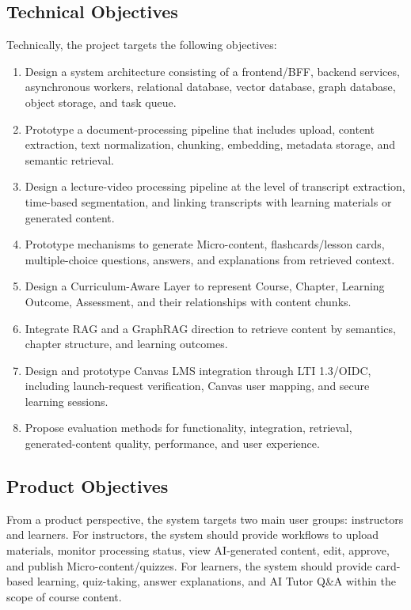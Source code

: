 \subsection{Technical Objectives}

Technically, the project targets the following objectives:
\begin{enumerate}
    \item Design a system architecture consisting of a frontend/BFF, backend
          services, asynchronous workers, relational database, vector
          database, graph database, object storage, and task queue.
    \item Prototype a document-processing pipeline that includes upload, content
          extraction, text normalization, chunking, embedding, metadata
          storage, and semantic retrieval.
    \item Design a lecture-video processing pipeline at the level of transcript
          extraction, time-based segmentation, and linking transcripts with
          learning materials or generated content.
    \item Prototype mechanisms to generate Micro-content, flashcards/lesson
          cards, multiple-choice questions, answers, and explanations from
          retrieved context.
    \item Design a Curriculum-Aware Layer to represent Course, Chapter,
          Learning Outcome, Assessment, and their relationships with content
          chunks.
    \item Integrate RAG and a GraphRAG direction to retrieve content by
          semantics, chapter structure, and learning outcomes.
    \item Design and prototype Canvas LMS integration through LTI 1.3/OIDC,
          including launch-request verification, Canvas user mapping, and
          secure learning sessions.
    \item Propose evaluation methods for functionality, integration, retrieval,
          generated-content quality, performance, and user experience.
\end{enumerate}

\subsection{Product Objectives}

From a product perspective, the system targets two main user groups:
instructors and learners. For instructors, the system should provide workflows
to upload materials, monitor processing status, view AI-generated content,
edit, approve, and publish Micro-content/quizzes. For learners, the system
should provide card-based learning, quiz-taking, answer explanations, and AI
Tutor Q\&A within the scope of course content.

